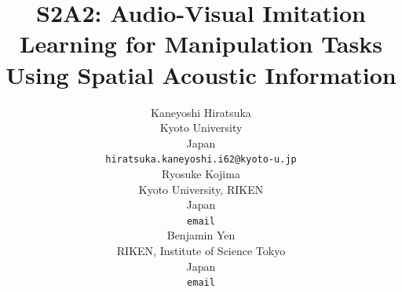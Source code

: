 \documentclass{article}
\title{S2A2: Audio-Visual Imitation Learning for Manipulation Tasks Using Spatial Acoustic Information}
\author{
  Kaneyoshi Hiratsuka\\
  Kyoto University \\
  Japan\\
  \texttt{hiratsuka.kaneyoshi.i62@kyoto-u.jp} \\
  \And
  Ryosuke Kojima \\
  Kyoto University, RIKEN \\
  Japan \\
  \texttt{email} \\
  \AND
  Benjamin Yen \\
  RIKEN, Institute of Science Tokyo \\
  Japan \\
  \texttt{email} \\
}
\begin{document}
\maketitle
\begin{abstract}



\end{abstract}
\end{document}

